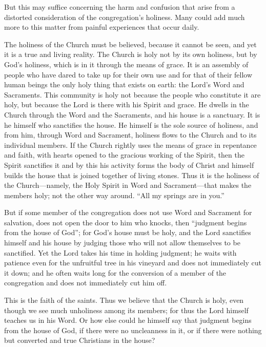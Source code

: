 
But this may suffice concerning the harm and confusion that arise from a distorted consideration of the congregation’s holiness. Many could add much more to this matter from painful experiences that occur daily.

The holiness of the Church must be believed, because it cannot be seen, and yet it is a true and living reality. The Church is holy not by its own holiness, but by God’s holiness, which is in it through the means of grace. It is an assembly of people who have dared to take up for their own use and for that of their fellow human beings the only holy thing that exists on earth: the Lord’s Word and Sacraments. This community is holy not because the people who constitute it are holy, but because the Lord is there with his Spirit and grace. He dwells in the Church through the Word and the Sacraments, and his house is a sanctuary. It is he himself who sanctifies the house. He himself is the sole source of holiness, and from him, through Word and Sacrament, holiness flows to the Church and to its individual members. If the Church rightly uses the means of grace in repentance and faith, with hearts opened to the gracious working of the Spirit, then the Spirit sanctifies it and by this his activity forms the body of Christ and himself builds the house that is joined together of living stones. Thus it is the holiness of the Church—namely, the Holy Spirit in Word and Sacrament—that makes the members holy; not the other way around. “All my springs are in you.”

But if some member of the congregation does not use Word and Sacrament for salvation, does not open the door to him who knocks, then “judgment begins from the house of God”; for God’s house must be holy, and the Lord sanctifies himself and his house by judging those who will not allow themselves to be sanctified. Yet the Lord takes his time in holding judgment; he waits with patience even for the unfruitful tree in his vineyard and does not immediately cut it down; and he often waits long for the conversion of a member of the congregation and does not immediately cut him off.

This is the faith of the saints. Thus we believe that the Church is holy, even though we see much unholiness among its members; for thus the Lord himself teaches us in his Word. Or how else could he himself say that judgment begins from the house of God, if there were no uncleanness in it, or if there were nothing but converted and true Christians in the house?

